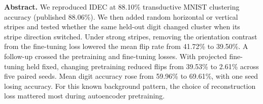 \textbf{Abstract.} We reproduced IDEC at 88.10\% transductive MNIST clustering accuracy (published 88.06\%). We then added random horizontal or vertical stripes and tested whether the same held-out digit changed cluster when its stripe direction switched. Under strong stripes, removing the orientation contrast from the fine-tuning loss lowered the mean flip rate from 41.72\% to 39.50\%. A follow-up crossed the pretraining and fine-tuning losses. With projected fine-tuning held fixed, changing pretraining reduced flips from 39.53\% to 2.61\% across five paired seeds. Mean digit accuracy rose from 59.96\% to 69.61\%, with one seed losing accuracy. For this known background pattern, the choice of reconstruction loss mattered most during autoencoder pretraining.
